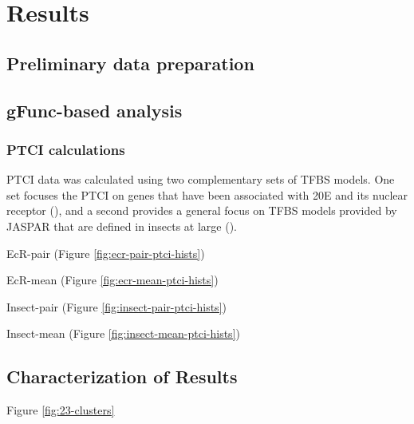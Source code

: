 

\chapter{Results} \label{chap:4}

\section{Preliminary data preparation}

\section{gFunc-based analysis}

\subsection{PTCI calculations}

\gls{PTCI} data was calculated using two complementary sets of \gls{TFBS} models.
One set focuses the \gls{PTCI} on genes that have been associated with \gls{20E} and its nuclear receptor (\PTCIe), and a second provides a general focus on \gls{TFBS} models provided by JASPAR that are defined in insects at large (\PTCIi).


EcR-pair (Figure \ref{fig:ecr-pair-ptci-hists})


EcR-mean (Figure \ref{fig:ecr-mean-ptci-hists})


Insect-pair (Figure \ref{fig:insect-pair-ptci-hists})


Insect-mean (Figure \ref{fig:insect-mean-ptci-hists})




\section{Characterization of Results}


Figure \ref{fig:23-clusters}

% 
% 
% 
% 
% 
% 
% 
% 



